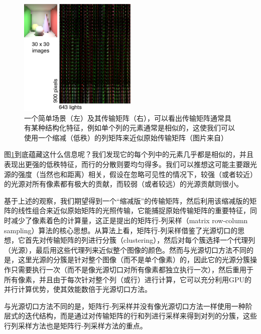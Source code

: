 \begin{figure}
	\sidecaption
	\includegraphics[width=0.5\textwidth]{figures/ir/low-rank-matrix}
	\caption{一个简单场景（左）及其传输矩阵（右），可以看出传输矩阵通常具有某种结构化特征，例如单个列的元素通常是相似的，这使我们可以使用一个缩减（低秩）的列矩阵来近似原始传输矩阵（图片来自\cite{a:MatrixRow-ColumnSamplingfortheMany-LightProblem}）}
	\label{f:ir-low-rank-matrix}
\end{figure}

图\ref{f:ir-low-rank-matrix}到底蕴藏这什么信息呢？我们发现它的每个列中的元素几乎都是相似的，并且表现出更强的低秩特征，而行的分散则要均匀得多。我们可以推想这可能主要跟光源的强度（当然也和距离）相关，假设在忽略可见性的情况下，较强（或者较近）的光源对所有像素都有极大的贡献，而较弱（或者较远）的光源贡献则很小。

基于上述的观察，我们期望得到一个“缩减版”的传输矩阵，然后利用该缩减版的矩阵的线性组合来近似原始矩阵的光照传输，它能捕捉原始传输矩阵的重要特征，同时减少了像素着色的计算量，这正是\cite{a:MatrixRow-ColumnSamplingfortheMany-LightProblem}提出的矩阵行-列采样（matrix row-column sampling）算法的核心思想。从算法上看，矩阵行-列采样借鉴了光源切口的思想，它首先对传输矩阵的列进行分簇（clustering），然后对每个簇选择一个代理列（光源），最后用这些代理列来近似整个图像的颜色。然而与光源切口方法不同的是，这里光源的分簇是针对整个图像（而不是单个像素）的，因此它的光源分簇操作只需要执行一次（而不是像光源切口对所有像素都独立执行一次），然后重用于所有像素，并且由于每次针对整个列（或行）进行计算，它可以充分利用GPU的并行计算优势，使其效能数倍于光源切口方法。

与光源切口方法不同的是，矩阵行-列采样并没有像光源切口方法一样使用一种阶层式的迭代结构，而是通过对传输矩阵的行和列进行采样来得到对列的分簇，这些行列采样方法也是矩阵行-列采样方法的重点。




